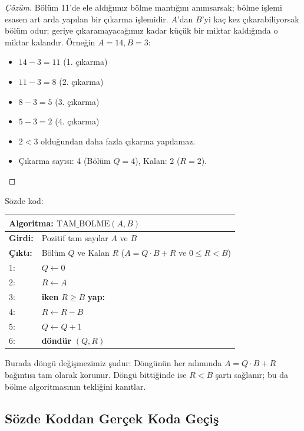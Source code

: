 \begin{proof}[Çözüm]
Bölüm 11'de ele aldığımız bölme mantığını anımsarsak; bölme işlemi esasen art arda yapılan bir çıkarma işlemidir. $A$'dan $B$'yi kaç kez çıkarabiliyorsak bölüm odur; geriye çıkaramayacağımız kadar küçük bir miktar kaldığında o miktar kalandır.
Örneğin $A = 14, B = 3$:
\begin{itemize}
    \item $14 - 3 = 11$ (1. çıkarma)
    \item $11 - 3 = 8$ (2. çıkarma)
    \item $8 - 3 = 5$ (3. çıkarma)
    \item $5 - 3 = 2$ (4. çıkarma)
    \item $2 < 3$ olduğundan daha fazla çıkarma yapılamaz.
    \item Çıkarma sayısı: 4 (Bölüm $Q = 4$), Kalan: 2 ($R = 2$).
\end{itemize}
\end{proof}

Sözde kod:
\begin{center}
\begin{minipage}{1.0\textwidth}
\begin{tabular}{p{2.4cm}p{9.4cm}}
\hline
\multicolumn{2}{l}{\textbf{Algoritma:} $\text{TAM\_BOLME}(A, B)$} \\
\hline
\textbf{Girdi:} & Pozitif tam sayılar $A$ ve $B$ \\
\textbf{Çıktı:} & Bölüm $Q$ ve Kalan $R$ ($A = Q \cdot B + R$ ve $0 \le R < B$) \\
1: & $Q \leftarrow 0$ \\
2: & $R \leftarrow A$ \\
3: & \textbf{iken} $R \ge B$ \textbf{yap:} \\
4: & \quad $R \leftarrow R - B$ \\
5: & \quad $Q \leftarrow Q + 1$ \\
6: & \textbf{döndür} $(Q, R)$ \\
\hline
\end{tabular}
\end{minipage}
\end{center}

Burada döngü değişmezimiz şudur: Döngünün her adımında $A = Q \cdot B + R$ bağıntısı tam olarak korunur. Döngü bittiğinde ise $R < B$ şartı sağlanır; bu da bölme algoritmasının tekliğini kanıtlar.

\subsection{Sözde Koddan Gerçek Koda Geçiş}

